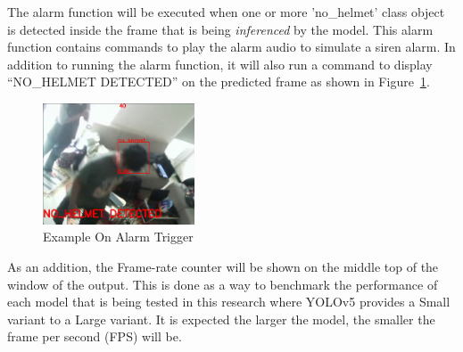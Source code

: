 \par The alarm function will be executed when one or more 'no\_helmet' 
class object is detected inside the frame that is being \emph{inferenced} by the model. 
This alarm function contains commands to play the alarm audio to simulate a siren alarm. 
In addition to running the alarm function, it will also run a command to display 
“NO\_HELMET DETECTED” on the predicted frame as shown in Figure~\ref{fig:alarmtriggerexample}.

\begin{figure} [ht]
  \centering
  \includegraphics[width=0.4\textwidth]{gambar/utilities/alarm_example.png}

  \caption{Example On Alarm Trigger}
  \label{fig:alarmtriggerexample}
\end{figure}

\par As an addition, the Frame-rate counter will be shown on the middle top of the window 
of the output. This is done as a way to benchmark the performance of each model that 
is being tested in this research where YOLOv5 provides a Small variant to a Large variant. 
It is expected the larger the model, the smaller the frame per second (FPS) will be.